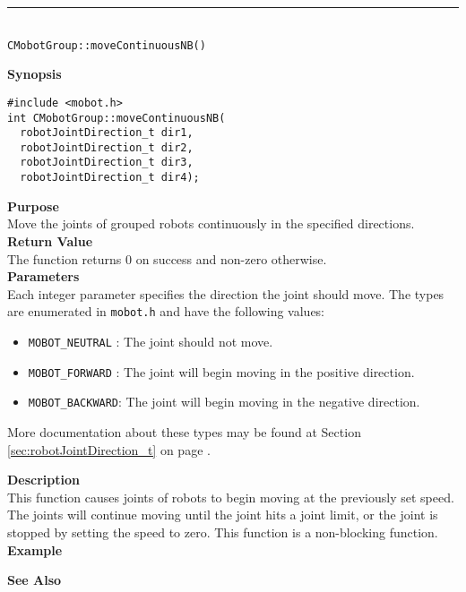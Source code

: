 \noindent
\vspace{5pt}
\rule{4.5in}{0.015in}\\
\noindent
{\LARGE \texttt{CMobotGroup::moveContinuousNB()}}\\
{}

\noindent
{\bf Synopsis}\\
\begin{verbatim}
#include <mobot.h>
int CMobotGroup::moveContinuousNB(
  robotJointDirection_t dir1, 
  robotJointDirection_t dir2, 
  robotJointDirection_t dir3, 
  robotJointDirection_t dir4);
\end{verbatim}

\noindent
{\bf Purpose}\\
Move the joints of grouped robots continuously in the specified directions.\\

\noindent
{\bf Return Value}\\
The function returns 0 on success and non-zero otherwise.\\

\noindent
{\bf Parameters}\\
Each integer parameter specifies the direction the joint should move. The types
are enumerated in \texttt{mobot.h} and have the following values:
\begin{itemize}
\item \texttt{MOBOT\_NEUTRAL} : The joint should not move.
\item \texttt{MOBOT\_FORWARD} : The joint will begin moving in the positive direction.
\item \texttt{MOBOT\_BACKWARD}: The joint will begin moving in the negative direction.
\end{itemize}
More documentation about these types may be found at Section
\ref{sec:robotJointDirection_t} on page
\pageref{sec:robotJointDirection_t}.

\noindent
{\bf Description}\\
This function causes joints of robots to begin moving at the previously set
speed. The joints will continue moving until the joint hits a joint limit, or
the joint is stopped by setting the speed to zero. This function is a non-blocking
function.\\

\noindent
{\bf Example}\\
\noindent

\noindent
{\bf See Also}\\

